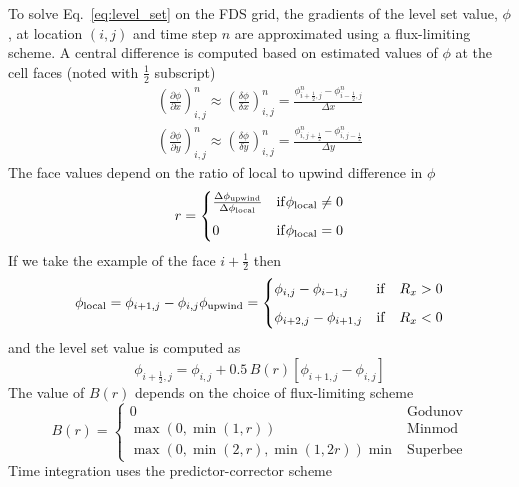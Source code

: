 To solve Eq.~\ref{eq:level_set} on the FDS grid, the gradients of the level set value, $\phi$, at location $(i,j)$ and time step $n$ are approximated using a flux-limiting scheme. A central difference is computed based on estimated values of $\phi$ at the cell faces (noted with $\frac{1}{2}$ subscript)
\begin{gather}
\left(\frac{\partial \phi}{\partial x}\right)_{i, j}^{n} \approx \left(\frac{\delta \phi}{\delta x}\right)_{i, j}^{n} =
\frac{\phi_{i+\frac{1}{2}, j}^{n}-\phi_{i-\frac{1}{2}, j}^{n}}{\Delta x} \\[8pt]
\left(\frac{\partial \phi}{\partial y}\right)_{i, j}^{n} \approx \left(\frac{\delta \phi}{\delta y}\right)_{i, j}^{n} =
\frac{\phi_{i, j+\frac{1}{2}}^{n}-\phi_{i, j-\frac{1}{2}}^{n}}{\Delta y}
\end{gather}
The face values depend on the ratio of local to upwind difference in $\phi$
\begin{equation}
r= \begin{cases}
    \frac{\Delta \phi_{\rm upwind}}{\Delta \phi_{\rm local}} & \mathrm{if} \phi_{\rm local} \neq 0 \\[6pt]
    0 & \mathrm{if} \phi_{\rm local} = 0
\end{cases}
\end{equation}
If we take the example of the face $i+\frac{1}{2}$ then
\begin{gather}
\phi_{\rm local} = \phi_{i+1, j}-\phi_{i, j}
\phi_{\rm upwind}= \begin{cases}
    \phi_{i, j}-\phi_{i-1, j} & \mathrm{if} \quad R_x > 0 \\[6pt]
    \phi_{i+2, j}-\phi_{i+1, j} & \mathrm{if} \quad R_x < 0
\end{cases}
\end{gather}
and the level set value is computed as
\begin{equation}
\phi_{i+\frac{1}{2},j} = \phi_{i,j} + 0.5 \, B(r) \left[\phi_{i+1,j}-\phi_{i,j} \right]
\end{equation}
The value of $B(r)$ depends on the choice of flux-limiting scheme
\begin{equation}
B(r)= \begin{cases}
    0 & \mathrm{Godunov} \\[8pt]
    \max(0, \min(1,r)) & \mathrm{Minmod} \\[8pt]
    \max(0, \min(2,r), \min(1,2r)) \min & \mathrm{Superbee}
\end{cases}
\end{equation}
Time integration uses the predictor-corrector scheme
